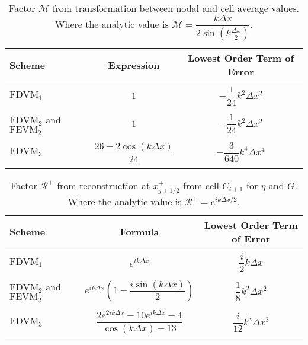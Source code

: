 \begin{table}
	\centering
	\begin{tabular}{l  c  c}
		Scheme& Expression& Lowest Order Term of Error \\
		\hline && \\
		$\text{FDVM}_1$ & $1$ & $-\dfrac{1}{24}k^2 \Delta x^2$ \\ & & \\
		$\text{FDVM}_2$ and $\text{FEVM}_2$& $1$ & $-\dfrac{1}{24}k^2 \Delta x^2$ \\ & & \\
		$\text{FDVM}_3$& $\dfrac{26 - 2 \cos\left(k \Delta x\right)}{24}$ & $-\dfrac{3}{640}k^4 \Delta x^4$ \\ & & \\
	\end{tabular}
	\caption{Factor $\mathcal{M}$ from transformation between nodal and cell average values. Where the analytic value is $\mathcal{M} = \dfrac{k\Delta x}{2 \sin \left(k\frac{\Delta x}{2}\right)  }$.}
	\label{tab:Mfactor}
\end{table}

\begin{table}
\centering
	\begin{tabular}{l  c  c}
		Scheme& Formula& Lowest Order Term of Error\\
		\hline && \\
		$\text{FDVM}_1$ & $e^{i k {\Delta x}}$ & $\dfrac{i}{2}k \Delta x$ \\ & & \\
		$\text{FDVM}_2$ and $\text{FEVM}_2$& $e^{i k {\Delta x}} \left(1 - \dfrac{i \sin\left(k\Delta x \right)}{2} \right)$ & $\dfrac{1}{8}k^2 \Delta x^2$ \\ & & \\
		$\text{FDVM}_3$& $\dfrac{2e^{2i k {\Delta x}} - 10e^{i k {\Delta x}} - 4}{\cos\left(k \Delta x\right) - 13}$ & $\dfrac{i}{12}k^3 \Delta x^3$ \\ & & \\
	\end{tabular}
	\caption{Factor $\mathcal{R}^+$ from reconstruction at $x^+_{j+1/2}$ from cell $C_{i+1}$ for $\eta$ and $G$. Where the analytic value is $\mathcal{R}^+ =e^{i k \Delta x/2}$. }
	\label{tab:Rpfactor}
\end{table}

